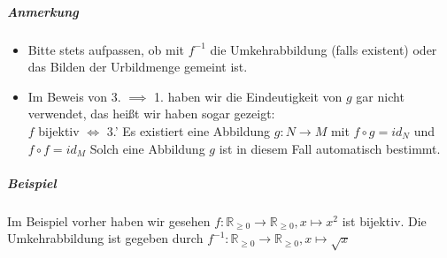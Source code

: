 \documentclass[a4paper]{scrartcl}
\theoremstyle{definition}
\theoremstyle{plain}
\theoremstyle{plain}
\theoremstyle{remark}
\theoremstyle{remark}
\theoremstyle{remark}
\theoremstyle{remark}
\theoremstyle{remark}
\begin{document}
\subparagraph{Anmerkung}
\label{sec-2-6-7-6-2}
\begin{itemize}
\item Bitte stets aufpassen, ob mit $f^{-1}$ die Umkehrabbildung (falls existent) oder das Bilden der Urbildmenge gemeint ist.
\item Im Beweis von 3. $\implies$ 1. haben wir die Eindeutigkeit von $g$ gar nicht verwendet, das heißt wir haben sogar gezeigt: \\
        $f$ bijektiv $\iff$ 3.' Es existiert eine Abbildung $g:N\to M$ mit $f\circ g = id_N$ und $f\circ f = id_M$ Solch eine Abbildung $g$ ist in diesem Fall automatisch bestimmt.
\end{itemize}
\subparagraph{Beispiel}
\label{sec-2-6-7-6-3}
Im Beispiel vorher haben wir gesehen $f:\mathbb{R}_{\geq 0} \to \mathbb{R}_{\geq 0}, x\mapsto x^2$ ist bijektiv.
Die Umkehrabbildung ist gegeben durch $f^{-1}:\mathbb{R}_{\geq 0} \to \mathbb{R}_{\geq 0}, x\mapsto \sqrt{x}$
\end{document}
